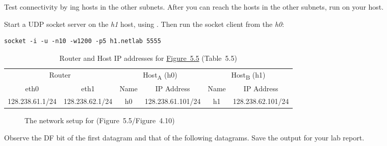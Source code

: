 \documentclass{../UTNetLab}
\begin{document}
Test connectivity by ing hosts in the other subnets.
After you can reach the
hosts in the other subnets, run  on your host.

Start a UDP socket server on the \textit{h1} host, using .
Then run the socket client from the \textit{h0}:
\begin{lstlisting}[emph={h1,netlab}]
socket -i -u -n10 -w1200 -p5 h1.netlab 5555
    \end{lstlisting}

\begin{table}[H]
    \caption{Router and Host IP addresses for \hyperref[fig:5.5]{Figure~5.5} (Table~5.5)}
    \centering
    \begin{tabular}{ *2c|*2c|*2c }
        \hline \hline
        \multicolumn{2}{c|}{Router} & \multicolumn{2}{c|}{Host\textsubscript{A} (h0)} & \multicolumn{2}{c}{Host\textsubscript{B} (h1)}                                                \\
        eth0                        & eth1                                            & Name                                           & IP Address        & Name & IP Address        \\
        \hline
        128.238.61.1/24             & 128.238.62.1/24                                 & h0                                             & 128.238.61.101/24 & h1   & 128.238.62.101/24 \\
        \hline \hline
    \end{tabular}
\end{table}

\begin{figure}[H]
    \centering
    \caption{The network setup for  (Figure~5.5/Figure~4.10)}
    \label{fig:5.5}
\end{figure}

Observe the DF bit of the first datagram and that of the following datagrams.
Save the  output for your lab report.
\end{document}

